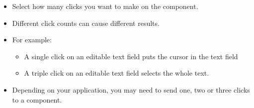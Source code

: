 \begin{itemize}
\item Select how many clicks you want to make on the component.
\item Different click counts can cause different results.
\item For example:
\begin{itemize}
\item A single click on an editable text field puts the cursor in the text field
\item A triple click on an editable text field selects the whole text.
\end{itemize}
\item Depending on your application, you may need to send one, two or three clicks to a component. 
\end{itemize}

